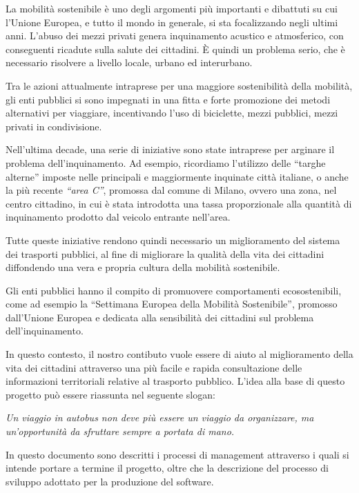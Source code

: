 La mobilit\`{a} sostenibile \`{e} uno degli argomenti pi\`{u} importanti e dibattuti su cui l\rq Unione Europea, e tutto il mondo in generale, si sta focalizzando negli ultimi anni. L\rq abuso dei mezzi privati genera inquinamento acustico e atmosferico, con conseguenti ricadute sulla salute dei cittadini. \`{E} quindi un problema serio, che \`{e} necessario risolvere a livello locale, urbano ed interurbano. 

Tra le azioni attualmente intraprese per una maggiore sostenibilit\`{a} della mobilit\`{a}, gli enti pubblici si sono impegnati in una fitta e forte promozione dei metodi alternativi per viaggiare, incentivando l\rq uso di biciclette, mezzi pubblici, mezzi privati in condivisione. 

Nell\rq ultima decade, una serie di iniziative sono state intraprese per arginare il problema dell\rq inquinamento. Ad esempio, ricordiamo l\rq utilizzo delle ``targhe alterne'' imposte nelle principali e maggiormente inquinate citt\`{a} italiane, o anche la pi\`{u} recente \emph{``area C''}, promossa dal comune di Milano, ovvero una zona, nel centro cittadino, in cui \`{e} stata introdotta una tassa proporzionale alla quantit\`{a} di inquinamento prodotto dal veicolo entrante nell\rq area.

Tutte queste iniziative rendono quindi necessario un miglioramento del sistema dei trasporti pubblici, al fine di migliorare la qualit\`{a} della vita dei cittadini diffondendo una vera e propria cultura della mobilit\`{a} sostenibile.

Gli enti pubblici hanno il compito di promuovere comportamenti ecosostenibili, come ad esempio la ``Settimana Europea della Mobilit\`{a} Sostenibile'', promosso dall\rq Unione Europea e dedicata alla sensibilit\`{a} dei cittadini sul problema dell\rq inquinamento.

In questo contesto, il nostro contibuto vuole essere di aiuto al miglioramento della vita dei cittadini attraverso una pi\`{u} facile e rapida consultazione delle informazioni territoriali relative al trasporto pubblico. L\rq idea alla base di questo progetto pu\`{o} essere riassunta nel seguente slogan:

\begin{center}
\emph{Un viaggio in autobus non deve pi\`{u} essere un viaggio da organizzare, ma un\rq opportunit\`{a} da sfruttare sempre a portata di mano.}
\end{center}

In questo documento sono descritti i processi di management attraverso i quali si intende portare a termine il progetto, oltre che la descrizione del processo di sviluppo adottato per la produzione del software. 

